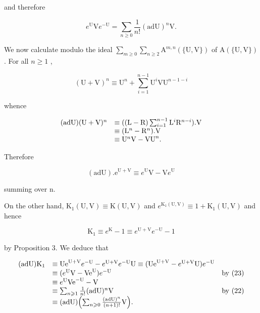 and therefore

\[
e ^ {\mathrm{U}} \mathrm{V} e ^ {- \mathrm{U}} = \sum_ {n \geqslant 0} \frac {1}{n !} (\mathrm{adU}) ^ {n} \mathrm{V}.\tag{22}
\]

We now calculate modulo the ideal \(\sum_{m\geqslant 0}\sum_{n\geqslant 2}\mathrm{A}^{m,n}(\{\mathrm{U},\mathrm{V}\})\) of \(\mathrm{A}(\{\mathrm{U},\mathrm{V}\})\) . For all \(n\geqslant 1\) ,

\[
(\mathrm{U} + \mathrm{V}) ^ {n} \equiv \mathrm{U} ^ {n} + \sum_ {i = 1} ^ {n - 1} \mathrm{U} ^ {i} \mathrm{V} \mathrm{U} ^ {n - 1 - i}
\]

whence

\[
\begin{array}{r l} (\mathrm{adU}) (\mathrm{U} + \mathrm{V}) ^ {n} & \equiv ((\mathrm{L} - \mathrm{R}) \sum_ {i = 1} ^ {n - 1} \mathrm{L} ^ {i} \mathrm{R} ^ {n - i}). \mathrm{V} \\ & \equiv (\mathrm{L} ^ {n} - \mathrm{R} ^ {n}). \mathrm{V} \\ & \equiv \mathrm{U} ^ {n} \mathrm{V} - \mathrm{VU} ^ {n}. \end{array}
\]

Therefore

\[
(\mathrm{ad} \mathrm{U}). \mathrm{e} ^ {\mathrm{U} + \mathrm{V}} \equiv e ^ {\mathrm{U}} \mathrm{V} - \mathrm{V} e ^ {\mathrm{U}}\tag{23}
\]

summing over n.

On the other hand, \(\mathrm{K}_1(\mathrm{U},\mathrm{V})\equiv \mathrm{K}(\mathrm{U},\mathrm{V})\) and \(e^{\mathrm{K}_1(\mathrm{U},\mathrm{V})}\equiv 1 + \mathrm{K}_1(\mathrm{U},\mathrm{V})\) and hence

\[
\mathrm{K} _ {1} \equiv e ^ {\mathrm{K}} - 1 \equiv e ^ {\mathrm{U} + \mathrm{V}} e ^ {- \mathrm{U}} - 1
\]

by Proposition 3. We deduce that

\[
\begin{array}{r l r} (\mathrm{adU}) \mathrm{K} _ {1} & \equiv \mathrm{Ue} ^ {\mathrm{U} + \mathrm{V}} e ^ {- \mathrm{U}} - e ^ {\mathrm{U} + \mathrm{V}} e ^ {- \mathrm{U}} \mathrm{U} \equiv (\mathrm{Ue} ^ {\mathrm{U} + \mathrm{V}} - e ^ {\mathrm{U} + \mathrm{V}} \mathrm{U}) e ^ {- \mathrm{U}} \\ & \equiv (e ^ {\mathrm{U}} \mathrm{V} - \mathrm{Ve} ^ {\mathrm{U}}) e ^ {- \mathrm{U}} & \text {by (23)} \\ & \equiv e ^ {\mathrm{U}} \mathrm{Ve} ^ {- \mathrm{U}} - \mathrm{V} \\ & \equiv \sum_ {n \geqslant 1} \frac {1}{n !} (\mathrm{adU}) ^ {n} \mathrm{V} & \text {by (22)} \\ & \equiv (\mathrm{adU}) \Bigl (\sum_ {n \geqslant 0} \frac {(\mathrm{adU}) ^ {n}}{(n + 1) !} \mathrm{V} \Bigr). \end{array}
\]

